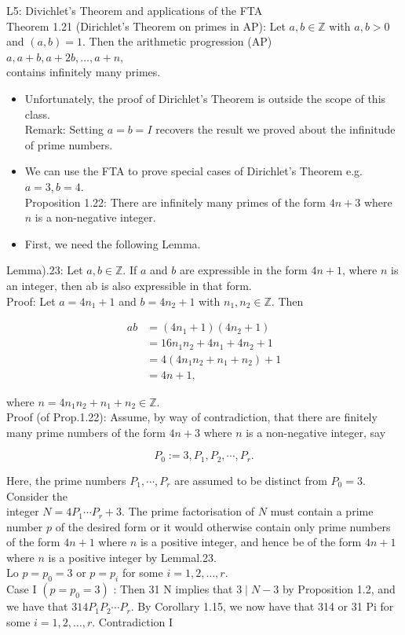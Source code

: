 \documentclass[10pt]{article}
\begin{document}
L5: Divichlet's Theorem and applications of the FTA\\
Theorem 1.21 (Dirichlet's Theorem on primes in AP): Let $a, b \in \mathbb{Z}$ with $a, b>0$ and $(a, b)=1$. Then the arithmetic progression (AP)\\
$a, a+b, a+2 b, \ldots, a+n$,\\
contains infinitely many primes.

\begin{itemize}
  \item Unfortunately, the proof of Dirichlet's Theorem is outside the scope of this class.\\
Remark: Setting $a=b=I$ recovers the result we proved about the infinitude of prime numbers.
  \item We can use the FTA to prove special cases of Dirichlet's Theorem e.g. $a=3, b=4$.\\
Proposition 1.22: There are infinitely many primes of the form $4 n+3$ where $n$ is a non-negative integer.
  \item First, we need the following Lemma.
\end{itemize}

Lemma).23: Let $a, b \in \mathbb{Z}$. If $a$ and $b$ are expressible in the form $4 n+1$, where $n$ is an integer, then ab is also expressible in that form.\\
Proof: Let $a=4 n_{1}+1$ and $b=4 n_{2}+1$ with $n_{1}, n_{2} \in \mathbb{Z}$. Then

$$
\begin{aligned}
a b & =\left(4 n_{1}+1\right)\left(4 n_{2}+1\right) \\
& =16 n_{1} n_{2}+4 n_{1}+4 n_{2}+1 \\
& =4\left(4 n_{1} n_{2}+n_{1}+n_{2}\right)+1 \\
& =4 n+1,
\end{aligned}
$$

where $n=4 n_{1} n_{2}+n_{1}+n_{2} \in \mathbb{Z}$.\\
Proof (of Prop.1.22): Assume, by way of contradiction, that there are finitely many prime numbers of the form $4 n+3$ where $n$ is a non-negative integer, say

$$
P_{0}:=3, P_{1}, P_{2}, \cdots, P_{r} .
$$

Here, the prime numbers $P_{1}, \cdots, P_{r}$ are assumed to be distinct from $P_{0}=3$. Consider the\\
integer $N=4 P_{1} \cdots P_{r}+3$. The prime factorisation of $N$ must contain a prime number $p$ of the desired form or it would otherwise contain only prime numbers of the form $4 n+1$ where $n$ is a positive integer, and hence be of the form $4 n+1$ where $n$ is a positive integer by Lemmal.23.\\
Lo $p=p_{0}=3$ or $p=p_{i}$ for some $i=1,2, \ldots, r$.\\
Case I $\left(p=p_{0}=3\right)$ : Then 31 N implies that $3 \mid N-3$ by Proposition 1.2, and we have that $314 P_{1} P_{2} \cdots P_{r}$. By Corollary 1.15, we now have that 314 or 31 Pi for some $i=1,2, \ldots, r$. Contradiction I
\end{document}
